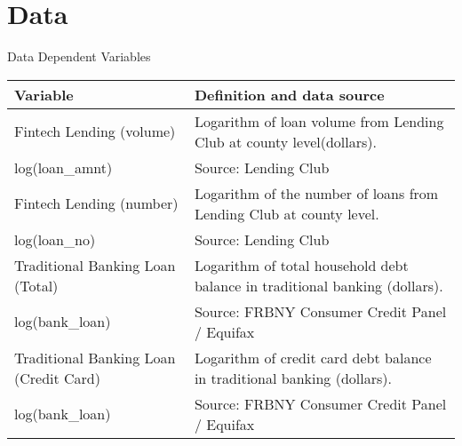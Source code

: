 \documentclass[11pt]{beamer}
\begin{document}
\section{Data}

\begin{frame}{Data}
    Dependent Variables
    \begin{tabular}{|p{4cm}|p{6cm}|}
        \hline
        \textbf{Variable} & \textbf{Definition and data source}  \\ 
        \hline
        Fintech Lending (volume) & Logarithm of loan volume from Lending Club at county level(dollars).   \\
        log(loan\_amnt) & Source: Lending Club   \\ 
        \hline
        Fintech Lending (number)  & Logarithm of the number of loans from Lending Club at county level.    \\
        log(loan\_no) & Source: Lending Club   \\
        \hline
        Traditional Banking Loan (Total) & Logarithm of total household debt balance in traditional banking (dollars).     \\ 
        log(bank\_loan) & Source: FRBNY Consumer Credit Panel / Equifax   \\ 
        \hline
        Traditional Banking Loan (Credit Card) & Logarithm of credit card debt balance in traditional banking (dollars).    \\ 
        log(bank\_loan) & Source: FRBNY Consumer Credit Panel / Equifax   \\ 
        \hline
    \end{tabular}
\end{frame}
\end{document}
